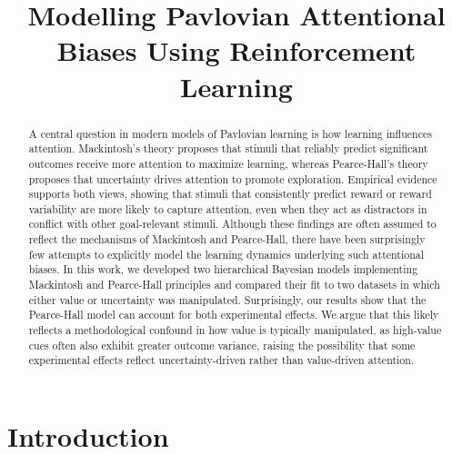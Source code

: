 \documentclass[11pt]{article}
\title{Modelling Pavlovian Attentional Biases Using Reinforcement
Learning}
\author{
  Francisco Garre-Frutos\thanks{Mind, Brain and Behavior Research Center
(CIMCYC) and Department of Experimental Psychology, University of
Granada, Granada, Spain}\\
            University of Granada \\ %
              Granada, Spain \\ %
                  \texttt{fgfrutos@ugr.es} \\ %
        \And %
    David Luque\thanks{Department of Basic Psychology and Málaga
Institute of Biomedical Research (IBIMA), University of Málaga, Málaga,
Spain}\\
            University of Malaga \\ %
              Málaga, Spain \\ %
                  \texttt{dluque@uma.es} \\ %
        \AND %
    Pablo Martínez-López\footnote[2]\\\\
            University of Malaga \\ %
              Málaga, Spain \\ %
                  \texttt{mlpablocorreo@gmail.com} \\ %
        \And %
    Juan Lupiáñez\footnote[1]\\\\
            University of Granada \\ %
              Granada, Spain \\ %
                  \texttt{jlupiane@ugr.es} \\ %
        \And %
    Miguel A. Vadillo\thanks{Department of Basic Psychology, Autonomous
University of Madrid, Madrid, Spain}\\
            Autonomous University of Madrid \\ %
              Madrid, Spain \\ %
                  \texttt{miguel.vadillo@uam.es} \\ %
  }
\begin{document}

\maketitle

\begin{abstract}
A central question in modern models of Pavlovian learning is how
learning influences attention. Mackintosh's theory proposes that stimuli
that reliably predict significant outcomes receive more attention to
maximize learning, whereas Pearce-Hall's theory proposes that
uncertainty drives attention to promote exploration. Empirical evidence
supports both views, showing that stimuli that consistently predict
reward or reward variability are more likely to capture attention, even
when they act as distractors in conflict with other goal-relevant
stimuli. Although these findings are often assumed to reflect the
mechanisms of Mackintosh and Pearce-Hall, there have been surprisingly
few attempts to explicitly model the learning dynamics underlying such
attentional biases. In this work, we developed two hierarchical Bayesian
models implementing Mackintosh and Pearce-Hall principles and compared
their fit to two datasets in which either value or uncertainty was
manipulated. Surprisingly, our results show that the Pearce-Hall model
can account for both experimental effects. We argue that this likely
reflects a methodological confound in how value is typically
manipulated, as high-value cues often also exhibit greater outcome
variance, raising the possibility that some experimental effects reflect
uncertainty-driven rather than value-driven attention.
\end{abstract}



\startmain %

\section{Introduction}\label{introduction}
\end{document}
